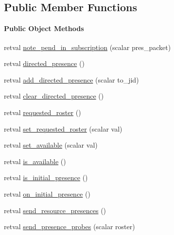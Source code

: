 \subsection*{\-Public \-Member \-Functions}
\begin{Indent}\paragraph*{\-Public \-Object \-Methods}
\begin{DoxyCompactItemize}
\item 
retval \hyperlink{class_d_jabberd_1_1_connection_1_1_client_in_a5f7e7e0838fc028cb4baaf8cb21dad0d}{note\-\_\-pend\-\_\-in\-\_\-subscription} (scalar pres\-\_\-packet)
\item 
retval \hyperlink{class_d_jabberd_1_1_connection_1_1_client_in_a67e78d435cfa122f091c30078e791a33}{directed\-\_\-presence} ()
\item 
retval \hyperlink{class_d_jabberd_1_1_connection_1_1_client_in_a30b849d6d0be14a439e2b726880853ad}{add\-\_\-directed\-\_\-presence} (scalar to\-\_\-jid)
\item 
retval \hyperlink{class_d_jabberd_1_1_connection_1_1_client_in_a2af83fdc4a220ab68a41573a9b074eec}{clear\-\_\-directed\-\_\-presence} ()
\item 
retval \hyperlink{class_d_jabberd_1_1_connection_1_1_client_in_a8eadada4d947e6c56aa31eea35fba538}{requested\-\_\-roster} ()
\item 
retval \hyperlink{class_d_jabberd_1_1_connection_1_1_client_in_a7f69d0bc421569afc91401cfa809fede}{set\-\_\-requested\-\_\-roster} (scalar val)
\item 
retval \hyperlink{class_d_jabberd_1_1_connection_1_1_client_in_acfd97337ef310e8c389153121178dff0}{set\-\_\-available} (scalar val)
\item 
retval \hyperlink{class_d_jabberd_1_1_connection_1_1_client_in_a086c53d811806e058f5737f15c6457b2}{is\-\_\-available} ()
\item 
retval \hyperlink{class_d_jabberd_1_1_connection_1_1_client_in_ade4ae443e1acd6d9bf18cb512a369b20}{is\-\_\-initial\-\_\-presence} ()
\item 
retval \hyperlink{class_d_jabberd_1_1_connection_1_1_client_in_a3c18e7985a786328ee0404f93da20deb}{on\-\_\-initial\-\_\-presence} ()
\item 
retval \hyperlink{class_d_jabberd_1_1_connection_1_1_client_in_a865aa988326884f3199b2494b59e57e4}{send\-\_\-resource\-\_\-presences} ()
\item 
retval \hyperlink{class_d_jabberd_1_1_connection_1_1_client_in_a756cb70e85c31065a4b87154bf18608b}{send\-\_\-presence\-\_\-probes} (scalar roster)

\end{DoxyCompactItemize}
\end{Indent}

